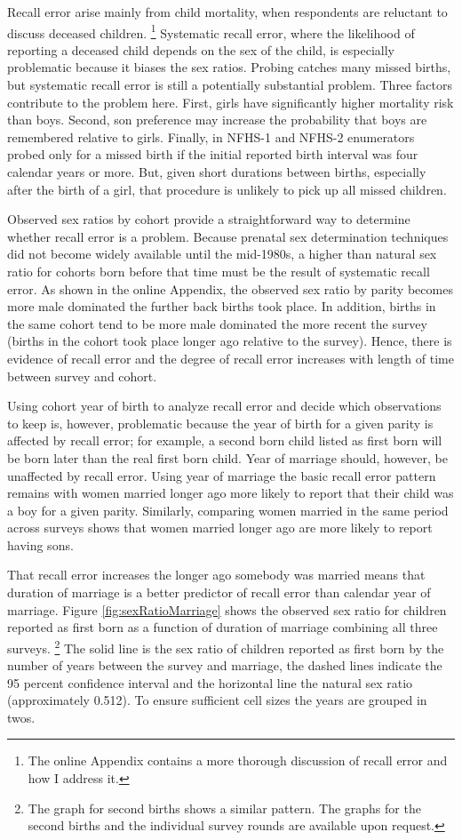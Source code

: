 \documentclass[12pt,letterpaper]{article}
\begin{document}
Recall error arise mainly from child mortality, when respondents are reluctant to
discuss deceased children.%
\footnote{
The online Appendix contains a more thorough discussion of recall error and how I address it.
} 
Systematic recall error, where the likelihood of reporting a deceased child depends on
the sex of the child, is especially problematic because it biases the sex ratios.
Probing catches many missed births, but systematic recall error is still a potentially 
substantial problem.
Three factors contribute to the problem here.
First, girls have significantly higher mortality risk than boys.
Second, son preference may increase the probability that boys are remembered relative to girls.
Finally, in NFHS-1 and NFHS-2 enumerators probed only for a missed birth if the
initial reported birth interval was four calendar years or more.
But, given short durations between births, especially after the birth of a girl,
that procedure is unlikely to pick up all missed children.

Observed sex ratios by cohort provide a straightforward way to determine 
whether recall error is a problem.
Because prenatal sex determination techniques did not become widely available until the 
mid-1980s, a higher than natural sex ratio for cohorts born before that time must be 
the result of systematic recall error.
As shown in the online Appendix, the observed sex ratio by parity becomes more male 
dominated the further back births took place.
In addition, births in the same cohort tend to be more male dominated the more recent the 
survey (births in the cohort took place longer ago relative to the survey).
Hence, there is evidence of recall error and the degree of recall error increases
with length of time between survey and cohort.

Using cohort year of birth to analyze recall error and decide which observations
to keep is, however, problematic because the year of birth for a given parity is affected 
by recall error; for example, a second born child listed as first born will be 
born later than the real first born child.
Year of marriage should, however, be unaffected by recall error.
Using year of marriage the basic recall error pattern remains with women married longer 
ago more likely to report that their child was a boy for a given parity.
Similarly, comparing women married in the same period across surveys shows
that women married longer ago are more likely to report having sons.

That recall error increases the longer ago somebody was married means
that duration of marriage is a better predictor of recall error than calendar year of 
marriage.
Figure \ref{fig:sexRatioMarriage} shows the observed sex ratio for children 
reported as first born as a function of duration of marriage combining all three surveys.%
\footnote{
The graph for second births shows a similar pattern.
The graphs for the second births and the individual survey rounds are available upon request.
}
The solid line is the sex ratio of children reported 
as first born by the number of years between the survey and marriage, 
the dashed lines indicate the 95 percent confidence interval 
and the horizontal line the natural sex ratio (approximately 0.512).
To ensure sufficient cell sizes the years are grouped in twos.
\end{document}
